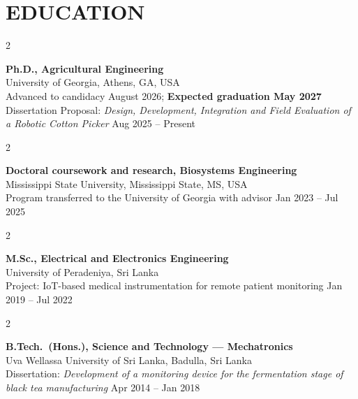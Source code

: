 \documentclass[10pt, letterpaper]{article}
\newenvironment{twocolentry}[2][]{%
    \onecolentry
    \def\secondColumn{#2}
    \setcolumnwidth{\fill, 4.2cm}
    \begin{paracol}{2}
}{%
    \switchcolumn \raggedleft \secondColumn
    \end{paracol}
    \endonecolentry
}
\begin{document}
\section{EDUCATION}
\vspace{0.08cm}

\begin{twocolentry}{Aug 2025 -- Present}
    \textbf{Ph.D., Agricultural Engineering} \\
    University of Georgia, Athens, GA, USA \\
    Advanced to candidacy August 2026; \textbf{Expected graduation May 2027} \\
    Dissertation Proposal: \emph{Design, Development, Integration and Field Evaluation of a
    Robotic Cotton Picker}
    \vspace{0.12cm}
\end{twocolentry}

\begin{twocolentry}{Jan 2023 -- Jul 2025}
    \textbf{Doctoral coursework and research, Biosystems Engineering} \\
    Mississippi State University, Mississippi State, MS, USA \\
    Program transferred to the University of Georgia with advisor
    \vspace{0.12cm}
\end{twocolentry}

\begin{twocolentry}{Jan 2019 -- Jul 2022}
    \textbf{M.Sc., Electrical and Electronics Engineering} \\
    University of Peradeniya, Sri Lanka \\
    Project: IoT-based medical instrumentation for remote patient monitoring
    \vspace{0.12cm}
\end{twocolentry}

\begin{twocolentry}{Apr 2014 -- Jan 2018}
    \textbf{B.Tech.\ (Hons.), Science and Technology --- Mechatronics} \\
    Uva Wellassa University of Sri Lanka, Badulla, Sri Lanka \\
    Dissertation: \emph{Development of a monitoring device for the fermentation stage of
    black tea manufacturing}
    \vspace{0.08cm}
\end{twocolentry}

\end{document}
